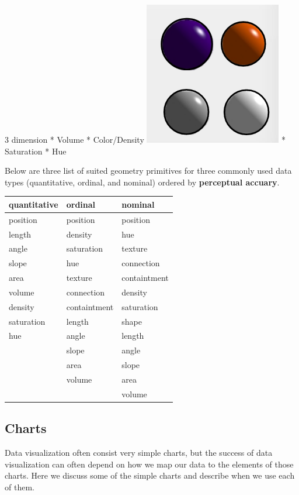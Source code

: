 \documentclass[11pt]{article}
\makeatletter
\def\maxwidth{\ifdim\Gin@nat@width>\linewidth\linewidth
    \else\Gin@nat@width\fi}
\let\Oldincludegraphics\includegraphics
\renewcommand{\includegraphics}[1]{\Oldincludegraphics[width=.8\maxwidth]{#1}}
\makeatother
\begin{document}
3 dimension * Volume * Color/Density
\includegraphics{images/volume-density.png} * Saturation * Hue

Below are three list of suited geometry primitives for three commonly
used data types (quantitative, ordinal, and nominal) ordered by
\textbf{perceptual accuary}.

\begin{longtable}[]{@{}lll@{}}
\toprule
quantitative & ordinal & nominal\tabularnewline
\midrule
\endhead
position & position & position\tabularnewline
length & density & hue\tabularnewline
angle & saturation & texture\tabularnewline
slope & hue & connection\tabularnewline
area & texture & containtment\tabularnewline
volume & connection & density\tabularnewline
density & containtment & saturation\tabularnewline
saturation & length & shape\tabularnewline
hue & angle & length\tabularnewline
& slope & angle\tabularnewline
& area & slope\tabularnewline
& volume & area\tabularnewline
& & volume\tabularnewline
\bottomrule
\end{longtable}

    \subsection{Charts}\label{charts}

Data visualization often consist very simple charts, but the success of
data visualization can often depend on how we map our data to the
elements of those charts. Here we discuss some of the simple charts and
describe when we use each of them.
\end{document}

